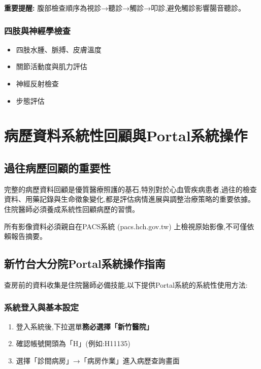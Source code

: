\documentclass[12pt,a4paper]{article}
\newcommand{\note}[1]{
    \par
    \noindent
    \begin{tcolorbox}[
        colback=emergency_blue!5!white,
        colframe=emergency_blue,
        title=\textbf{重點提醒},
        fonttitle=\bfseries,
        boxrule=0.5pt,
        arc=3pt,
        left=6pt,
        right=6pt,
        top=6pt,
        bottom=6pt
    ]
    #1
    \end{tcolorbox}
}
\begin{document}
\begin{importantbox}
\textbf{重要提醒:} 腹部檢查順序為視診→聽診→觸診→叩診,避免觸診影響腸音聽診。
\end{importantbox}

\subsubsection{四肢與神經學檢查}
\begin{itemize}[nosep]
    \item 四肢水腫、脈搏、皮膚溫度
    \item 關節活動度與肌力評估
    \item 神經反射檢查
    \item 步態評估
\end{itemize}

\section{病歷資料系統性回顧與Portal系統操作}

\subsection{過往病歷回顧的重要性}
完整的病歷資料回顧是優質醫療照護的基石,特別對於心血管疾病患者,過往的檢查資料、用藥記錄與生命徵象變化,都是評估病情進展與調整治療策略的重要依據。住院醫師必須養成系統性回顧病歷的習慣。

\vspace{0.5cm}
\note{
所有影像資料必須親自在PACS系統 (pacs.hch.gov.tw) 上檢視原始影像,不可僅依賴報告摘要。
}

\subsection{新竹台大分院Portal系統操作指南}
查房前的資料收集是住院醫師必備技能,以下提供Portal系統的系統性使用方法:

\subsubsection{系統登入與基本設定}
\begin{enumerate}[nosep]
    \item 登入系統後,下拉選單\textbf{務必選擇「新竹醫院」}
    \item 確認帳號開頭為「H」(例如:H11135)
    \item 選擇「診間病房」→「病房作業」進入病歷查詢畫面
\end{enumerate}
\end{document}
